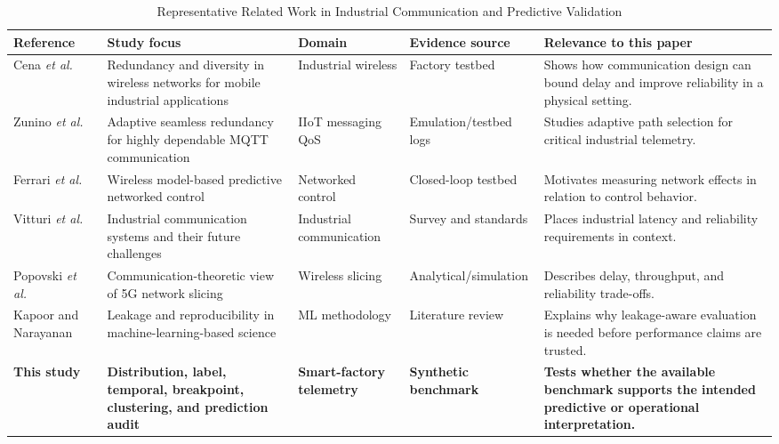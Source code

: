 \documentclass[conference]{IEEEtran}
\begin{document}
\begin{table}[t]
\caption{Representative Related Work in Industrial Communication and Predictive Validation}
\label{tab:related_work}
\centering
\scriptsize
\setlength{\tabcolsep}{3pt}
\begin{tabularx}{\textwidth}{@{}l >{\raggedright\arraybackslash}p{4.2cm} >{\raggedright\arraybackslash}p{2.6cm} >{\raggedright\arraybackslash}p{2.2cm} X@{}}
\toprule
\textbf{Reference} & \textbf{Study focus} & \textbf{Domain} & \textbf{Evidence source} & \textbf{Relevance to this paper} \\
\midrule
Cena \textit{et al.}~\cite{cena2021redundancy} & Redundancy and diversity in wireless networks for mobile industrial applications & Industrial wireless & Factory testbed & Shows how communication design can bound delay and improve reliability in a physical setting. \\
Zunino \textit{et al.}~\cite{zunino2024adaptive} & Adaptive seamless redundancy for highly dependable MQTT communication & IIoT messaging QoS & Emulation/testbed logs & Studies adaptive path selection for critical industrial telemetry. \\
Ferrari \textit{et al.}~\cite{ferrari2011wireless} & Wireless model-based predictive networked control & Networked control & Closed-loop testbed & Motivates measuring network effects in relation to control behavior. \\
Vitturi \textit{et al.}~\cite{vitturi2019industrial} & Industrial communication systems and their future challenges & Industrial communication & Survey and standards & Places industrial latency and reliability requirements in context. \\
Popovski \textit{et al.}~\cite{popovski20185g} & Communication-theoretic view of 5G network slicing & Wireless slicing & Analytical/simulation & Describes delay, throughput, and reliability trade-offs. \\
Kapoor and Narayanan~\cite{kapoor2023leakage} & Leakage and reproducibility in machine-learning-based science & ML methodology & Literature review & Explains why leakage-aware evaluation is needed before performance claims are trusted. \\
\textbf{This study} & \textbf{Distribution, label, temporal, breakpoint, clustering, and prediction audit} & \textbf{Smart-factory telemetry} & \textbf{Synthetic benchmark} & \textbf{Tests whether the available benchmark supports the intended predictive or operational interpretation.} \\
\bottomrule
\end{tabularx}
\end{table}
\end{document}
